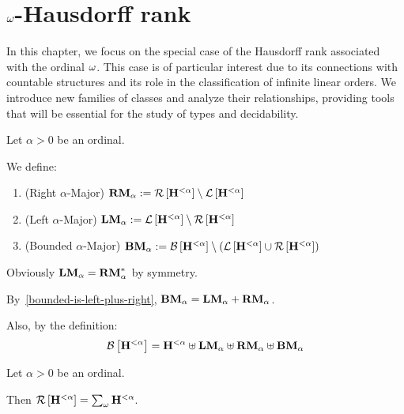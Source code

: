 \section{\texorpdfstring{$\omega$}{omega}-Hausdorff rank}

In this chapter, we focus on the special case of the Hausdorff rank associated with the ordinal $\omega$. This case is of particular interest due to its connections with countable structures and its role in the classification of infinite linear orders. We introduce new families of classes and analyze their relationships, providing tools that will be essential for the study of types and decidability.

\begin{definition}\label{bounded-definitions}
  Let $\alpha > 0$ be an ordinal.

  We define:
  \begin{enumerate}
    \item (Right $\alpha$-Major) $\mathbf{RM}_{\alpha} := \mathcal{R} \left[ {{\mathbf{H}_{}^{< \alpha}}} \right] \setminus \mathcal{L} \left[ {{\mathbf{H}_{}^{< \alpha}}} \right]$
    \item (Left $\alpha$-Major) $\mathbf{LM}_{\alpha} := \mathcal{L} \left[ {{\mathbf{H}_{}^{< \alpha}}} \right] \setminus \mathcal{R} \left[ {{\mathbf{H}_{}^{< \alpha}}} \right]$
    \item (Bounded $\alpha$-Major) $\mathbf{BM}_{\alpha} := \mathcal{B} \left[ {{\mathbf{H}_{}^{< \alpha}}} \right] \setminus \left( { \mathcal{L} \left[ {{\mathbf{H}_{}^{< \alpha}}} \right] \cup \mathcal{R} \left[ {{\mathbf{H}_{}^{< \alpha}}} \right] } \right)$
  \end{enumerate}
\end{definition}

\begin{note}
  Obviously $\mathbf{LM}_{\alpha} = \mathbf{RM}_{\alpha}^\ast$ by symmetry.

  By~\cref{bounded-is-left-plus-right}, $\mathbf{BM}_{\alpha} = \mathbf{LM}_{\alpha} + \mathbf{RM}_{\alpha}$.

  Also, by the definition:
  \[
    \mathcal{B} \left[ {{\mathbf{H}_{}^{< \alpha}}} \right] = \mathbf{H}_{}^{< \alpha} \uplus \mathbf{LM}_{\alpha}
    \uplus \mathbf{RM}_{\alpha} \uplus \mathbf{BM}_{\alpha}
  \]
\end{note}

\begin{lemma}\label{bounded-structure}
  Let $\alpha > 0$ be an ordinal.

  Then $\mathcal{R} \left[ {{\mathbf{H}_{}^{< \alpha}}} \right] = \sum_{\omega}{\mathbf{H}_{}^{< \alpha}}$.
\end{lemma}

